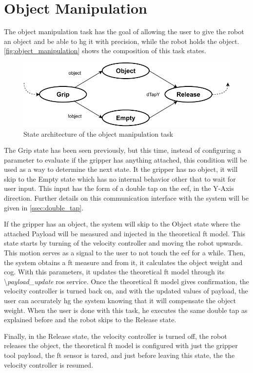 




\section{Object Manipulation}

\par The object manipulation task has the goal of allowing the user to give the robot an object and be able to \ac{hg} it with precision, while the robot holds the object. \autoref{fig:object_manipulation} shows the composition of this task states.

\begin{figure}[h]
    \centering
    \includegraphics[width=0.7\linewidth]{figs/chp5/object_manipulation.pdf}
    \caption{State architecture of the object manipulation task}
    \label{fig:object_manipulation}
\end{figure}

\par The Grip state has been seen previously, but this time, instead of configuring a parameter to evaluate if the gripper has anything attached, this condition will be used as a way to determine the next state. It the gripper has no object, it will skip to the Empty state which has no internal behavior other that to wait for user input. This input has the form of a double tap on the \ac{eef}, in the Y-Axis direction. Further details on this communication interface with the system will be given in \autoref{ssec:double_tap}.
\par If the gripper has an object, the system will skip to the Object state where the attached Payload will be measured and injected in the theoretical \ac{ft} model. This state starts by turning of the velocity controller and moving the robot upwards. This motion serves as a signal to the user to not touch the \ac{eef} for a while. Then, the system obtains a \ac{ft} measure and from it, it calculates the object weight and \ac{cog}. With this parameters, it updates the theoretical \ac{ft} model through its \textbackslash\textit{payload\_update} \ac{ros} service. Once the theoretical \ac{ft} model gives confirmation, the velocity controller is turned back on, and with the updated values of payload, the user can accurately \ac{hg} the system knowing that it will compensate the object weight. When the user is done with this task, he executes the same double tap as explained before and the robot skips to the Release state.
\par Finally, in the Release state, the velocity controller is turned off, the robot releases the object, the theoretical \ac{ft} model is configured with just the gripper tool payload, the \ac{ft} sensor is tared, and just before leaving this state, the the velocity controller is resumed.

